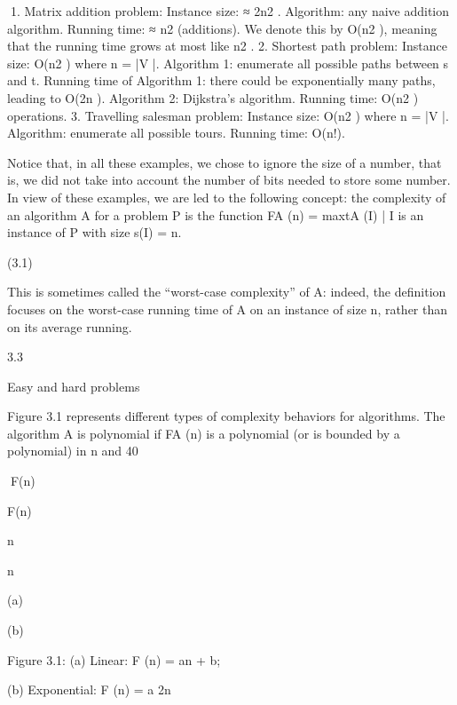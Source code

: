 \documentclass[titlepage]{book}
\theoremstyle{plain}
\theoremstyle{definition}
\theoremstyle{remark}
\begin{document}
1. Matrix addition problem:
Instance size: ≈ 2n2 .
Algorithm: any naive addition algorithm.
Running time: ≈ n2 (additions). We denote this by O(n2 ), meaning that the running time grows
at most like n2 .
2. Shortest path problem:
Instance size: O(n2 ) where n = |V |.
Algorithm 1: enumerate all possible paths between s and t.
Running time of Algorithm 1: there could be exponentially many paths, leading to O(2n ).
Algorithm 2: Dijkstra's algorithm.
Running time: O(n2 ) operations.
3. Travelling salesman problem:
Instance size: O(n2 ) where n = |V |.
Algorithm: enumerate all possible tours.
Running time: O(n!).

Notice that, in all these examples, we chose to ignore the size of a number, that is, we did not take into
account the number of bits needed to store some number.
In view of these examples, we are led to the following concept: the complexity of an algorithm A for a
problem P is the function
FA (n) = max{tA (I) | I is an instance of P with size s(I) = n}.

(3.1)

This is sometimes called the “worst-case complexity” of A: indeed, the definition focuses on the worst-case
running time of A on an instance of size n, rather than on its average running.

3.3

Easy and hard problems

Figure 3.1 represents different types of complexity behaviors for algorithms.
The algorithm A is polynomial if FA (n) is a polynomial (or is bounded by a polynomial) in n and
40

F(n)

F(n)

n

n

(a)

(b)

Figure 3.1: (a) Linear: F (n) = an + b;

(b) Exponential: F (n) = a 2n
\end{document}
